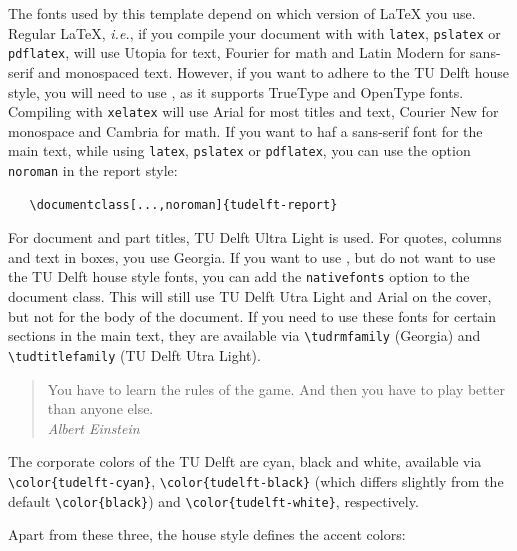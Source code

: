 The fonts used by this template depend on which version of \LaTeX{} you use. Regular \LaTeX, \emph{i.e.}, if you compile your document with with \texttt{latex}, \texttt{pslatex} or \texttt{pdflatex}, will use Utopia for text, Fourier for math and Latin Modern for sans-serif and monospaced text.
However, if you want to adhere to the TU Delft house style, you will need to use \XeLaTeX, as it supports TrueType and OpenType fonts. Compiling with \texttt{xelatex} will use Arial for most titles and text, Courier New for monospace and Cambria for math. If you want to haf a sans-serif font for the
main text, while using \texttt{latex}, \texttt{pslatex} or \texttt{pdflatex}, you can use the option \texttt{noroman} in the report style:
\begin{verbatim}
   \documentclass[...,noroman]{tudelft-report}
\end{verbatim}
For document and part titles,  TU Delft Ultra Light is used. For quotes, columns and text in boxes, you use Georgia. If you want to use \XeLaTeX, but do not want to use the TU Delft house style fonts, you can add the \texttt{nativefonts} option to the document class. This will still use  TU Delft Utra Light and Arial on the cover, but not for the body of the document. If you need to use these fonts for certain sections in the main text, they are available via \verb|\tudrmfamily| (Georgia) and \verb|\tudtitlefamily| (TU Delft Utra Light).

\begin{quote}
    You have to learn the rules of the game. And then you have to play better than anyone else.\\
    \emph{Albert Einstein}
\end{quote}

The corporate colors of the TU Delft are cyan, black and white, available via
    {\color{tudelft-cyan}\verb|\color{tudelft-cyan}|},
{\color{tudelft-black}\verb|\color{tudelft-black}|}
(which differs slightly from the default
    {\color{black}\verb|\color{black}|})
and \verb|\color{tudelft-white}|, respectively.

Apart from these three, the house style defines the accent colors:

